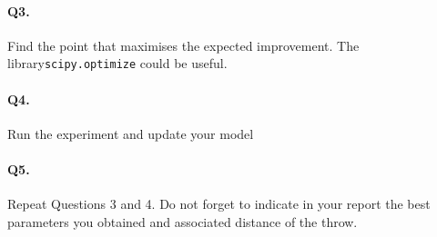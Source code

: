 \documentclass[12pt]{scrartcl}
\begin{document}
\paragraph{Q3.} Find the point that maximises the expected improvement. The library\linebreak \texttt{scipy.optimize} could be useful.

\paragraph{Q4.} Run the experiment and update your model

\paragraph{Q5.} Repeat Questions 3 and 4. Do not forget to indicate in your report the best parameters you obtained and associated distance of the throw.
\end{document}
